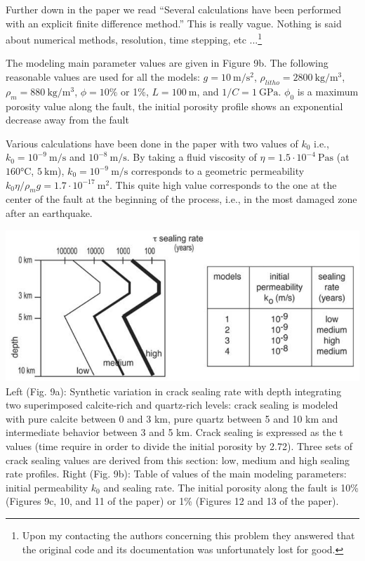 Further down in the paper we read
``Several calculations have been performed with an
explicit finite difference method.''
This is really vague. Nothing is said about numerical methods, resolution, 
time stepping, etc ...\footnote{Upon my contacting the authors concerning 
this problem they answered that the original code and its documentation 
was unfortunately lost for good.}

The modeling main
parameter values are given in Figure 9b.
The following reasonable values are used for all the models:
$g=10~\si{\meter\per\square\second}$, $\rho_{litho}=2800~\si{\kg\per\cubic\meter}$, 
$\rho_m=880~\si{\kg\per\cubic\meter}$, $\phi=10\%$ or 1\%,
$L=100~\si{\meter}$, and $1/C=1~\si{\giga\pascal}$.
$\phi_0$ is a maximum porosity value along the fault, the initial porosity profile shows an
exponential decrease away from the fault

Various calculations have been done in the paper with two values of $k_0$
i.e., $k_0 = 10^{-9}~\si{\meter\per\second}$ and $10^{-8}~\si{\meter\per\second}$. By taking a fluid
viscosity of $\eta= 1.5 \cdot 10^{-4}~\si{\pascal\second}$ (at $160\si{\celsius}$, $5~\si{\kilo\meter}$), 
$k_0= 10^{-9}~\si{\meter\per\second}$ corresponds to a geometric permeability 
$k_0 \eta/\rho_m g =1.7 \cdot 10^{-17}~\si{\square\meter}$. This quite high value corresponds to the
one at the center of the fault at the beginning of the process,
i.e., in the most damaged zone after an earthquake.

\newpage
\begin{center}
\includegraphics[width=15cm]{python_codes/fieldstone_126/images/grfr03a}\\
{\captionfont 
Left (Fig. 9a): Synthetic variation
in crack sealing rate with depth integrating two superimposed calcite-rich and quartz-rich levels: crack
sealing is modeled with pure calcite between 0 and 3 km, pure quartz between 5 and 10 km and
intermediate behavior between 3 and 5 km. Crack sealing is expressed as the t values (time require in
order to divide the initial porosity by 2.72). Three sets of crack sealing values are derived from this
section: low, medium and high sealing rate profiles.
Right (Fig. 9b): Table of values of the main modeling parameters:
initial permeability $k_0$ and sealing rate. 
The initial porosity along the fault is 10\% (Figures 9c, 10, and 11 of the paper) 
or 1\% (Figures 12 and 13 of the paper).}
\end{center}



